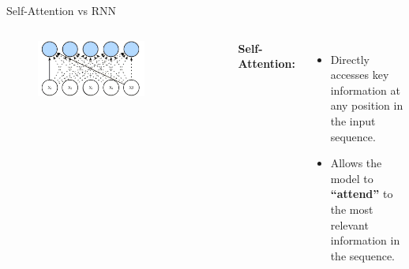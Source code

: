 \documentclass[serif, aspectratio=169]{beamer}
\begin{document}
\begin{frame}{Self-Attention vs RNN}
	
	\begin{columns}
		\begin{figure}
			\centering
			\includegraphics[width=0.7\textwidth]{pic/self-attention--1.jpg}
		\end{figure}
		\textbf{Self-Attention:}
		\begin{itemize}
			\item Directly accesses key information at any position in the input sequence.
			\item Allows the model to \textbf{``attend''} to the most relevant information in the sequence.
		\end{itemize}
		

\end{columns}
\end{frame}
\end{document}
